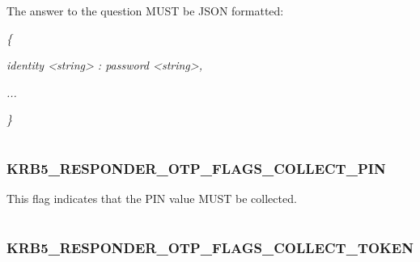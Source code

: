 \documentclass[letterpaper,10pt,english]{sphinxmanual}
\begin{document}
The answer to the question MUST be JSON formatted:

\emph{\{}

\emph{identity \textless{}string\textgreater{} : password \textless{}string\textgreater{},}

\emph{...}

\emph{\}}

\begin{tabulary}{\linewidth}{|L|L|}
\hline

 & 
\\
\hline\end{tabulary}



\subsubsection{KRB5\_RESPONDER\_OTP\_FLAGS\_COLLECT\_PIN}
\label{appdev/refs/macros/KRB5_RESPONDER_OTP_FLAGS_COLLECT_PIN:krb5-responder-otp-flags-collect-pin-data}\label{appdev/refs/macros/KRB5_RESPONDER_OTP_FLAGS_COLLECT_PIN::doc}\label{appdev/refs/macros/KRB5_RESPONDER_OTP_FLAGS_COLLECT_PIN:krb5-responder-otp-flags-collect-pin}

\begin{fulllineitems}
\label{appdev/refs/macros/KRB5_RESPONDER_OTP_FLAGS_COLLECT_PIN:KRB5_RESPONDER_OTP_FLAGS_COLLECT_PIN}
\end{fulllineitems}


This flag indicates that the PIN value MUST be collected.

\begin{tabulary}{\linewidth}{|L|L|}
\hline

 & 
\\
\hline\end{tabulary}



\subsubsection{KRB5\_RESPONDER\_OTP\_FLAGS\_COLLECT\_TOKEN}
\label{appdev/refs/macros/KRB5_RESPONDER_OTP_FLAGS_COLLECT_TOKEN:krb5-responder-otp-flags-collect-token-data}\label{appdev/refs/macros/KRB5_RESPONDER_OTP_FLAGS_COLLECT_TOKEN:krb5-responder-otp-flags-collect-token}\label{appdev/refs/macros/KRB5_RESPONDER_OTP_FLAGS_COLLECT_TOKEN::doc}
\end{document}
